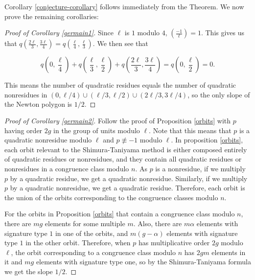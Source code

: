 \documentclass{article}
\theoremstyle{remark}
\theoremstyle{definition}
\begin{document}
\par Corollary \ref{conjecture-corollary} follows immediately from the Theorem. We now prove the remaining corollaries: 

\begin{proof}[Proof of Corollary \ref{germain1}]
    Since $\ell$ is $1$ modulo $4$, $\left( \frac{-1}{\ell} \right) = 1$. This gives us that $q\left( \frac{2\ell}{3}, \frac{3\ell}{4} \right) = q\left(\frac{\ell}{4}, \frac{\ell}{3} \right)$. We then see that 
    
    \[q\left(0, \frac{\ell}{4} \right) + q\left(\frac{\ell}{3}, \frac{\ell}{2} \right) + q\left(\frac{2\ell}{3}, \frac{3\ell}{4} \right) = q\left(0,\frac{\ell}{2}\right) = 0.\]
    
    This means the number of quadratic residues equals the number of quadratic nonresidues in $(0,\ell/4) \cup (\ell/3,\ell/2) \cup (2\ell/3,3\ell/4)$, so the only slope of the Newton polygon is $1/2$.
\end{proof}

\begin{proof}[Proof of Corollary \ref{germain2}]
    Follow the proof of Proposition \ref{orbits} with $p$ having order $2g$ in the group of units modulo $\ell$. Note that this means that $p$ is a quadratic nonresidue modulo $\ell$ and $p \not \equiv -1$ modulo $\ell$. In proposition \ref{orbits}, each orbit relevant to the Shimura-Taniyama method is either composed entirely of quadratic residues or nonresidues, and they contain all quadratic residues or nonresidues in a congruence class modulo $n$. As $p$ is a nonresidue, if we multiply $p$ by a quadratic residue, we get a quadratic nonresidue. Similarly, if we multiply $p$ by a quadratic nonresidue, we get a quadratic residue. Therefore, each orbit is the union of the orbits corresponding to the congruence classes modulo $n$.
    
    For the orbits in Proposition \ref{orbits} that contain a congruence class modulo $n$, there are $mg$ elements for some multiple $m$. Also, there are $m\alpha$ elements with signature type $1$ in one of the orbits, and $m(g-\alpha)$ elements with signature type $1$ in the other orbit. Therefore, when $p$ has multiplicative order $2g$ modulo $\ell$, the orbit corresponding to a congruence class modulo $n$ has $2gm$ elements in it and $mg$ elements with signature type one, so by the Shimura-Taniyama formula we get the slope $1/2$.
\end{proof}
\end{document}
